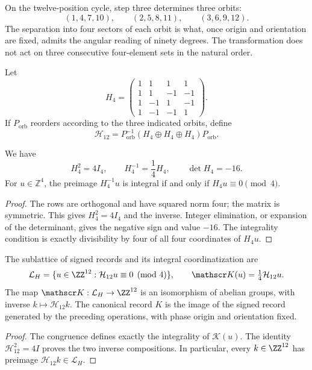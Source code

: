 On the twelve-position cycle, step three determines three orbits:
\[
 (1,4,7,10),\qquad(2,5,8,11),\qquad(3,6,9,12).
\]
The separation into four sectors of each orbit is what, once
origin and orientation are fixed, admits the angular reading of ninety degrees. The
transformation does not act on three consecutive four-element sets in the natural order.

Let
\[
 H_4=\begin{pmatrix}
 1&1&1&1\\1&1&-1&-1\\1&-1&1&-1\\1&-1&-1&1
 \end{pmatrix}.
\]
If \(P_{\mathrm{orb}}\) reorders according to the three indicated orbits,
define
\[
 \mathcal H_{12}=P_{\mathrm{orb}}^{-1}
 (H_4\oplus H_4\oplus H_4)P_{\mathrm{orb}}.
\]

\begin{lemma}
\label{lem:k-hadamard}
We have
\[
 H_4^2=4I_4,\qquad H_4^{-1}=\frac14H_4,\qquad\det H_4=-16.
\]
For \(u\in\mathbb Z^4\), the preimage \(H_4^{-1}u\) is integral if and
only if \(H_4u\equiv0\pmod4\).
\end{lemma}

\begin{proof}
The rows are orthogonal and have squared norm four; the matrix is
symmetric. This gives \(H_4^2=4I_4\) and the inverse. Integer elimination,
or expansion of the determinant, gives the negative sign and value \(-16\).
The integrality condition is exactly divisibility by four
of all four coordinates of \(H_4u\).
\end{proof}

\begin{definition}
The sublattice of signed records and its integral coordinatization are
\[
 \mathcal L_H=\{u\in\ZZ^{12}:\mathcal H_{12}u\equiv0\pmod4\},
 \qquad \mathscr K(u)=\tfrac14\mathcal H_{12}u.
\]
The map \(\mathscr K:\mathcal L_H\to\ZZ^{12}\) is an isomorphism
of abelian groups, with inverse \(k\mapsto\mathcal H_{12}k\).
The canonical record \(K\) is the image of the signed record generated
by the preceding operations, with phase origin and orientation fixed.
\end{definition}

\begin{proof}
The congruence defines exactly the integrality of \(\mathscr K(u)\).
The identity \(\mathcal H_{12}^2=4I\) proves the two inverse
compositions. In particular, every \(k\in\ZZ^{12}\) has preimage
\(\mathcal H_{12}k\in\mathcal L_H\).
\end{proof}

